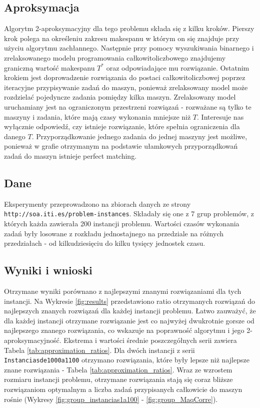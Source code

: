 \documentclass{article}
\begin{document}
\subsection{Aproksymacja}
Algorytm 2-aproksymacyjny dla tego problemu składa się z kilku kroków. Pierszy krok polega na określeniu zakresu makespanu w którym on się znajduje przy użyciu algorytmu zachłannego. 
Następnie przy pomocy wyszukiwania binarnego i zrelaksowanego modelu programowania całkowitoliczbowego znajdujemy graniczną wartość makespanu $T^*$ oraz odpowiadające mu rozwiązanie.
Ostatnim krokiem jest doprowadzenie rozwiązania do postaci całkowitoliczbowej poprzez iteracyjne przypisywanie zadań do maszyn, ponieważ zrelaksowany model może rozdzielać pojedyncze zadania pomiędzy kilka maszyn.
Zrelaksowany model uruchamiany jest na ograniczonym przestrzeni rozwiązań - rozważane są tylko te maszyny i zadania, które mają czasy wykonania mniejsze niż $T$. Interesuje nas wyłącznie odpowiedź, czy istnieje rozwiązanie, które spełnia ograniczenia dla danego $T$.
Przyporządkowanie jednego zadania do jednej maszyny jest możliwe, ponieważ w grafie otrzymanym na podstawie ułamkowych przyporządkowań zadań do maszyn istnieje perfect matching.

\subsection{Dane}
Eksperymenty przeprowadzono na zbiorach danych ze strony \texttt{http://soa.iti.es/problem-instances}. Składały się one z 7 grup problemów, z których każda zawierała 200 instancji problemu.
Wartości czasów wykonania zadań były losowane z rozkładu jednostajnego na przedziale na różnych przedziałach - od kilkudziesięciu do kilku tysięcy jednostek czasu.

\subsection{Wyniki i wnioski}
Otrzymane wyniki porównano z najlepszymi znanymi rozwiązaniami dla tych instancji. 
Na Wykresie \ref{fig:results} przedstawiono ratio otrzymanych rozwiązań do najlepszych znanych rozwiązań dla każdej instancji problemu.
Łatwo zauważyć, że dla każdej instancji otrzymane rozwiązanie jest co najwyżej dwukrotnie gorsze od najlepszego znanego rozwiązania, co wskazuje na poprawność algorytmu i jego 2-aproksymacyjność.
Ekstrema i wartości średnie poszczegółnych serii zawiera Tabela \ref{tab:approximation_ratios}.
Dla dwóch instancji z serii \texttt{Instanciasde1000a1100} otrzymano rozwiązania, które były lepsze niż najlepsze znane rozwiązania - Tabela \ref{tab:approximation_ratios}.
Wraz ze wzrostem rozmiaru instancji problemu, otrzymane rozwiązania stają się coraz bliższe rozwiązaniom optymalnym a liczba zadań przypisanych całkowicie do maszyn rośnie (Wykresy \ref{fig:group_instancias1a100} - \ref{fig:group_MaqCorre}).
\end{document}
